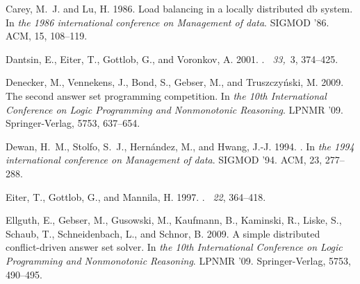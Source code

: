 \documentclass[preprint]{tlp}
\begin{document}
\begin{thebibliography}
{\sc Carey, M.~J.} {\sc and} {\sc Lu, H.} 1986.
\newblock Load balancing in a locally distributed db system.
\newblock In {\em the 1986 international conference
  on Management of data}. SIGMOD '86. ACM, 15, 108--119.

{\sc Dantsin, E.}, {\sc Eiter, T.}, {\sc Gottlob, G.}, {\sc and} {\sc Voronkov,
  A.} 2001.
.
~{\em 33,\/}~3, 374--425.

{\sc Denecker, M.}, {\sc Vennekens, J.}, {\sc Bond, S.}, {\sc Gebser, M.}, {\sc
  and} {\sc Truszczy{\'n}ski, M.} 2009.
\newblock The second answer set programming competition.
\newblock In {\em the 10th International Conference on Logic
  Programming and Nonmonotonic Reasoning}. LPNMR '09. Springer-Verlag, 5753, 637--654.

{\sc Dewan, H.~M.}, {\sc Stolfo, S.~J.}, {\sc Hern\'{a}ndez, M.}, {\sc and}
  {\sc Hwang, J.-J.} 1994.
.
\newblock In {\em the 1994  international conference
  on Management of data}. SIGMOD '94. ACM, 23, 277--288.

{\sc Eiter, T.}, {\sc Gottlob, G.}, {\sc and} {\sc Mannila, H.} 1997.
.
~{\em 22\/}, 364--418.

{\sc Ellguth, E.}, {\sc Gebser, M.}, {\sc Gusowski, M.}, {\sc Kaufmann, B.},
  {\sc Kaminski, R.}, {\sc Liske, S.}, {\sc Schaub, T.}, {\sc Schneidenbach,
  L.}, {\sc and} {\sc Schnor, B.} 2009.
\newblock A simple distributed conflict-driven answer set solver.
\newblock In {\em the 10th International Conference on Logic
  Programming and Nonmonotonic Reasoning}. LPNMR '09. Springer-Verlag, 5753, 490--495.


\end{thebibliography}
\end{document}
